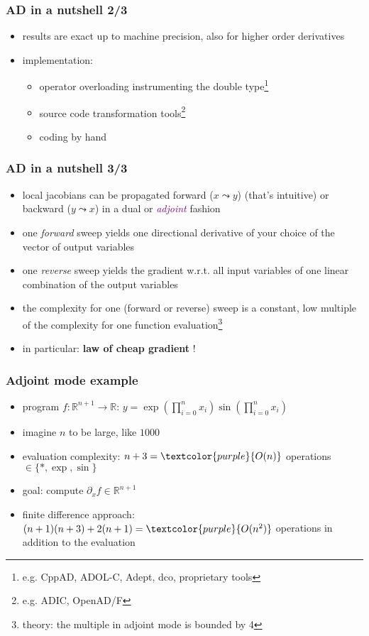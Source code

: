 \documentclass[10pt,German]{beamer}
\begin{document}
\begin{frame}[fragile]
\frametitle{AD in a nutshell 2/3}
\begin{itemize}
\item results are exact up to machine precision, also for higher order derivatives
\item implementation: \begin{itemize}
\item operator overloading instrumenting the double type\footnote{e.g. CppAD, ADOL-C, Adept, dco, proprietary tools}
\item source code transformation tools\footnote{e.g. ADIC, OpenAD/F}
\item coding by hand
\end{itemize}
\end{itemize}
\end{frame}

\begin{frame}[fragile]
\frametitle{AD in a nutshell 3/3}
\begin{itemize}
\item local jacobians can be propagated forward ($x\leadsto y$) (that's intuitive)  or backward ($y\leadsto x$) in a dual or \textcolor{purple}{\textit{adjoint}} fashion
\item one \textit{forward} sweep yields one directional derivative of your choice of the vector of output variables
\item one \textit{reverse} sweep yields the gradient w.r.t. all input variables of one linear combination of the output variables
\item the complexity for one (forward or reverse) sweep is a constant, low multiple of the complexity for one function evaluation\footnote{theory: the multiple in adjoint mode is bounded by 4}
\item in particular: \textbf{law of cheap gradient} !
\end{itemize}
\end{frame}

\begin{frame}[fragile]
\frametitle{Adjoint mode example}
\begin{itemize}
\item program $f:\mathbb{R}^{n+1}\rightarrow\mathbb{R}$: $y = \exp\left( \prod_{i=0}^n x_i \right) \sin\left( \prod_{i=0}^n x_i \right)$
\item imagine $n$ to be large, like $1000$
\item evaluation complexity: $n+3=\textcolor{purple}{O(n)}$ operations $\in \{*, \exp, \sin \}$
\item goal: compute $\partial_x f \in \mathbb{R}^{n+1}$
\item finite difference approach: $(n+1)(n+3) + 2(n+1) = \textcolor{purple}{O(n^2)}$ operations in addition to the evaluation
\end{itemize}
\end{frame}
\end{document}
